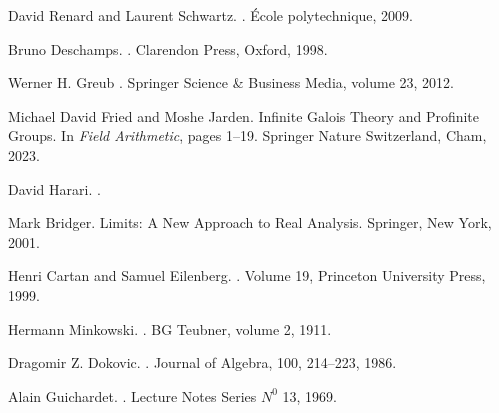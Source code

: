 \documentclass[a4paper, 14pt]{report}
\begin{document}
\begin{onehalfspace}
{\begin{thebibliography}{99}
	David Renard and Laurent Schwartz.  
	.  
	\newblock École polytechnique, 2009.
	
	
	Bruno Deschamps.
	.
	\newblock Clarendon Press, Oxford, 1998.
	
	
	Werner H. Greub
	.
	\newblock Springer Science \& Business Media, volume 23, 2012.
	
			
	Michael David Fried and Moshe Jarden.
	\newblock Infinite Galois Theory and Profinite Groups.
	\newblock In {\em Field Arithmetic}, pages 1--19. Springer Nature Switzerland, Cham, 2023.
	
	David Harari.
	.
	
	
	Mark  Bridger.
	\newblock Limits: A New Approach to Real Analysis.
	\newblock Springer, New York, 2001.
		
	Henri Cartan and Samuel Eilenberg.
	.
	\newblock Volume 19, Princeton University Press, 1999.
	
	
	
	
	
	

	
	
	Hermann Minkowski.
	.
	\newblock BG Teubner, volume 2, 1911.
	
	
	Dragomir Z. Dokovic.
	.
	\newblock Journal of Algebra, 100, 214--223, 1986.
	


	Alain Guichardet.
	.
	\newblock Lecture Notes Series $N^0$ 13, 1969.
	

\end{thebibliography}
	
}


\end{onehalfspace} 
\end{document}
